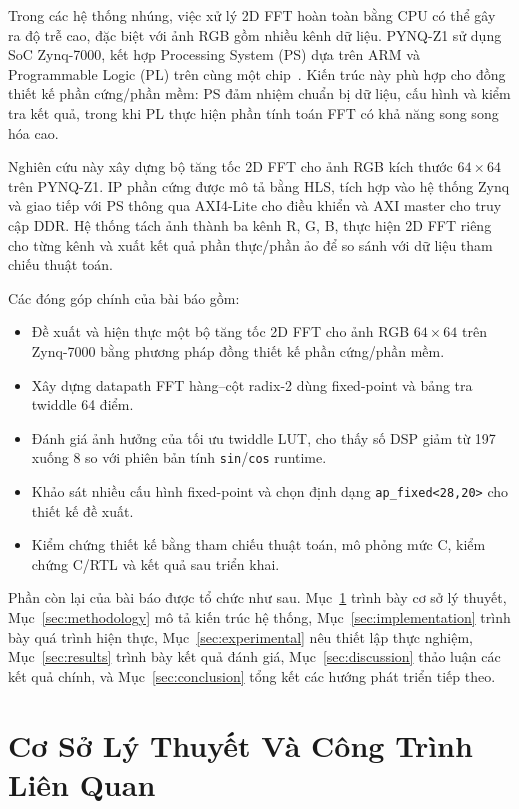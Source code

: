 ﻿\documentclass[conference]{IEEEtran}
\begin{document}
Trong các hệ thống nhúng, việc xử lý 2D FFT hoàn toàn bằng CPU có thể gây ra độ trễ cao, đặc biệt với ảnh RGB gồm nhiều kênh dữ liệu. PYNQ-Z1 sử dụng SoC Zynq-7000, kết hợp Processing System (PS) dựa trên ARM và Programmable Logic (PL) trên cùng một chip~\cite{xilinx_zynq_trm}. Kiến trúc này phù hợp cho đồng thiết kế phần cứng/phần mềm: PS đảm nhiệm chuẩn bị dữ liệu, cấu hình và kiểm tra kết quả, trong khi PL thực hiện phần tính toán FFT có khả năng song song hóa cao.

Nghiên cứu này xây dựng bộ tăng tốc 2D FFT cho ảnh RGB kích thước $64\times64$ trên PYNQ-Z1. IP phần cứng được mô tả bằng HLS, tích hợp vào hệ thống Zynq và giao tiếp với PS thông qua AXI4-Lite cho điều khiển và AXI master cho truy cập DDR. Hệ thống tách ảnh thành ba kênh R, G, B, thực hiện 2D FFT riêng cho từng kênh và xuất kết quả phần thực/phần ảo để so sánh với dữ liệu tham chiếu thuật toán.

Các đóng góp chính của bài báo gồm:
\begin{itemize}
    \item Đề xuất và hiện thực một bộ tăng tốc 2D FFT cho ảnh RGB $64\times64$ trên Zynq-7000 bằng phương pháp đồng thiết kế phần cứng/phần mềm.
    \item Xây dựng datapath FFT hàng--cột radix-2 dùng fixed-point và bảng tra twiddle 64 điểm.
    \item Đánh giá ảnh hưởng của tối ưu twiddle LUT, cho thấy số DSP giảm từ 197 xuống 8 so với phiên bản tính \texttt{sin}/\texttt{cos} runtime.
    \item Khảo sát nhiều cấu hình fixed-point và chọn định dạng \texttt{ap\_fixed<28,20>} cho thiết kế đề xuất.
    \item Kiểm chứng thiết kế bằng tham chiếu thuật toán, mô phỏng mức C, kiểm chứng C/RTL và kết quả sau triển khai.
\end{itemize}

Phần còn lại của bài báo được tổ chức như sau. Mục~\ref{sec:background} trình bày cơ sở lý thuyết, Mục~\ref{sec:methodology} mô tả kiến trúc hệ thống, Mục~\ref{sec:implementation} trình bày quá trình hiện thực, Mục~\ref{sec:experimental} nêu thiết lập thực nghiệm, Mục~\ref{sec:results} trình bày kết quả đánh giá, Mục~\ref{sec:discussion} thảo luận các kết quả chính, và Mục~\ref{sec:conclusion} tổng kết các hướng phát triển tiếp theo.

\section{Cơ Sở Lý Thuyết Và Công Trình Liên Quan}
\label{sec:background}
\end{document}
